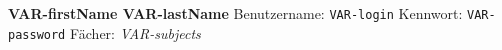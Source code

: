 \bigskip\textbf{\large VAR-firstName VAR-lastName}\medskip
Benutzername: \texttt{VAR-login}
Kennwort: \texttt{VAR-password}\smallskip
Fächer: \textsl{VAR-subjects}
~

